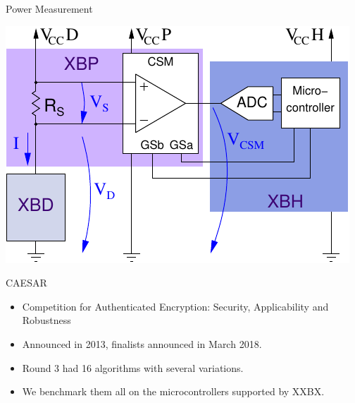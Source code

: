 \documentclass[xcolor=pdftex,dvipsnames,table,final]{beamer}
\begin{document}
\begin{frame}[fragile]{}
\begin{columns}[t, totalwidth=\textwidth]
\begin{column}{.675\linewidth}
\begin{columns}
\begin{column}{.473\linewidth}
\begin{block}{Power Measurement}
\begin{minipage}{0.48\linewidth}
          \begin{center}
            \vspace{-2ex}
            \includegraphics[scale=1.45]{../figures/ina225}
          \end{center} 
	\end{minipage} 
       \end{block}
       \begin{block}{CAESAR}
        \begin{itemize}
          \item Competition for Authenticated Encryption: Security, Applicability and Robustness
          \item Announced in 2013, finalists announced in March 2018.
          \item Round 3 had 16 algorithms with several variations.
          \item We benchmark them all on the microcontrollers supported by XXBX.
        \end{itemize}
       \end{block}


\end{column}
\end{columns}
\end{column}
\end{columns}
\end{frame}
\end{document}
